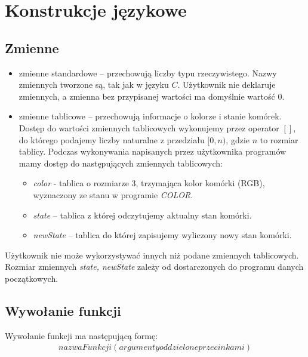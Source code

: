 \documentclass[declaration,shortabstract, inz]{iithesis}
\theoremstyle{definition} \newtheorem{definition}{Definicja}[]
\theoremstyle{plain} \newtheorem{remark}[definition]{Obserwacja}
\theoremstyle{plain} \newtheorem{theorem}[definition]{Twierdzenie}
\theoremstyle{plain} \newtheorem{example}{Przykład}[definition]
\theoremstyle{plain} \newtheorem{lemma}[definition]{Lemat}
\begin{document}
\section{Konstrukcje językowe}

\subsection{Zmienne}
\begin{itemize}
\item zmienne standardowe -- przechowują liczby typu rzeczywistego. Nazwy zmiennych tworzone są, tak jak w języku $C$. Użytkownik nie deklaruje zmiennych, a zmienna bez przypisanej wartości ma domyślnie wartość $0$.
\item zmienne tablicowe -- przechowują informacje o kolorze i stanie komórek. Dostęp do wartości zmiennych tablicowych wykonujemy przez operator $[]$, do którego podajemy liczby naturalne z przedziału $[0, n)$, gdzie $n$ to rozmiar tablicy. Podczas wykonywania napisanych przez użytkownika programów mamy dostęp do następujących zmiennych tablicowych: 
	\begin{itemize}
	\item \textit{color} - tablica o rozmiarze $3$, trzymająca kolor komórki (RGB), wyznaczony ze stanu w programie \textit{COLOR}. 
	\item \textit{state} -- tablica z której odczytujemy aktualny stan komórki.
	\item \textit{newState} -- tablica do której zapisujemy wyliczony nowy stan komórki.
	\end{itemize}
\end{itemize}
Użytkownik nie może wykorzystywać innych niż podane zmiennych tablicowych. Rozmiar zmiennych \textit{state, newState} zależy od dostarczonych do programu danych początkowych. 

\subsection{Wywołanie funkcji}
Wywołanie funkcji ma następującą formę:
\begin{align}
nazwaFunkcji(argumenty oddzielone przecinkami)
\end{align}
\end{document}
